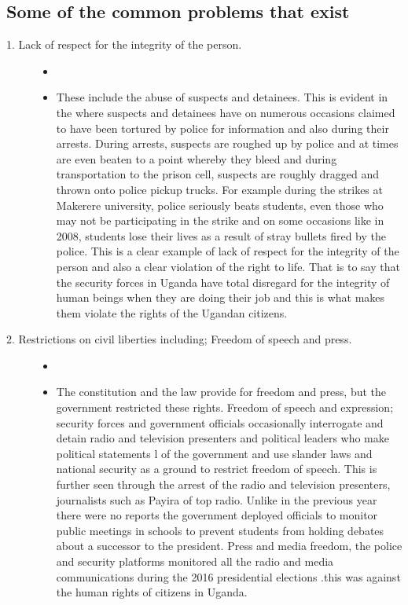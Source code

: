 \documentclass{article}
\begin{document}
\subsection{ Some of the common problems that exist}
\begin{description}
\item[1.	Lack of respect for the integrity of the person. ]
\begin{itemize}
 \item[]  
 \item 
These include the abuse of suspects and detainees. This is evident in the where suspects and detainees have on numerous occasions claimed to have been tortured by police for information and also during their arrests. During arrests, suspects are roughed up by police and at times are even beaten to a point whereby they bleed and during transportation to the prison cell, suspects are roughly dragged and thrown onto police pickup trucks. For example during the strikes at Makerere university, police seriously beats students, even those who may not be participating in the strike and on some occasions like in 2008, students lose their lives as a result of stray bullets fired by the police. This is a clear example of lack of respect for the integrity of the person and also a clear violation of the right to life. That is to say that the security forces in Uganda have total disregard for the integrity of human beings when they are doing their job and this is what makes them violate the rights of the Ugandan citizens.
 \end{itemize}
\item[2.	Restrictions on civil liberties including; Freedom of speech and press.]
\begin{itemize}
 \item[] 
\item
The constitution and the law provide for freedom and press, but the government restricted these rights. Freedom of speech and expression; security forces and government officials occasionally interrogate and detain radio and television presenters and political leaders who make political statements l of the government and use slander laws and national security as a ground to restrict freedom of speech. This is further seen through the arrest of the radio and television presenters, journalists such as Payira of top radio. Unlike in the previous year there were no reports the government deployed officials to monitor public meetings in schools to prevent students from holding debates about a successor to the president.
Press and media freedom, the police and security platforms monitored all the radio and media communications during the 2016 presidential elections .this was against the human rights of citizens in Uganda.


\end{itemize}
\end{description}
\end{document}
